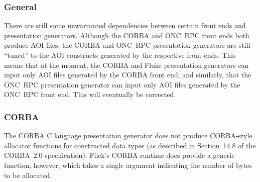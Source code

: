 \subsubsection{General}
\label{subsubsec:PG:General}

There are still some unwarranted dependencies between certain front ends and
presentation generators.  Although the CORBA and ONC~RPC front ends both
produce AOI files, the CORBA and ONC~RPC presentation generators are still
``tuned'' to the AOI constructs generated by the respective front ends.  This
means that at the moment, the CORBA and Fluke presentation generators can input
only AOI files generated by the CORBA front end, and similarly, that the
ONC~RPC presentation generator can input only AOI files generated by the
ONC~RPC front end.  This will eventually be corrected.

\subsubsection{CORBA}
\label{subsubsec:PG:CORBA}

The CORBA C language presentation generator does not produce CORBA-style
allocator functions for constructed data types (as described in Section~14.8 of
the CORBA~2.0 specification).  Flick's CORBA runtime does provide a generic
 function, however, which takes a single argument
indicating the number of bytes to be allocated.




